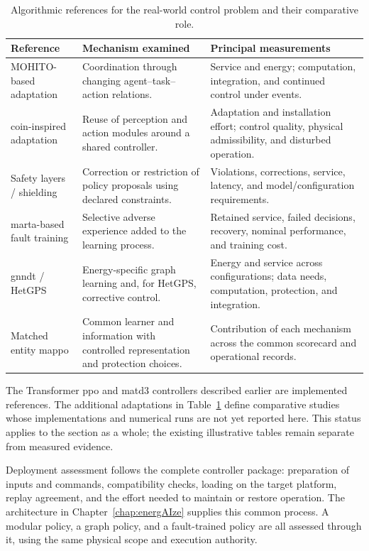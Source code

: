 \begin{table}[htbp]
\centering
\small
\caption{Algorithmic references for the real-world control problem and their comparative role.}
\label{tab:control-variable-references}
\begin{tabularx}{\textwidth}{@{}p{}p{}X@{}}
\toprule
\textbf{Reference} & \textbf{Mechanism examined} & \textbf{Principal measurements}\\
\midrule
MOHITO-based adaptation & Coordination through changing agent--task--action relations. & Service and energy; computation, integration, and continued control under events.\\
\addlinespace
\gls{coin}-inspired adaptation & Reuse of perception and action modules around a shared controller. & Adaptation and installation effort; control quality, physical admissibility, and disturbed operation.\\
\addlinespace
Safety layers / shielding & Correction or restriction of policy proposals using declared constraints. & Violations, corrections, service, latency, and model/configuration requirements.\\
\addlinespace
\gls{marta}-based fault training & Selective adverse experience added to the learning process. & Retained service, failed decisions, recovery, nominal performance, and training cost.\\
\addlinespace
\gls{gnndt} / HetGPS & Energy-specific graph learning and, for HetGPS, corrective control. & Energy and service across configurations; data needs, computation, protection, and integration.\\
\addlinespace
Matched entity \gls{mappo} & Common learner and information with controlled representation and protection choices. & Contribution of each mechanism across the common scorecard and operational records.\\
\bottomrule
\end{tabularx}
\end{table}

The Transformer \gls{ppo} and \gls{matd3} controllers described earlier are implemented references. The additional adaptations in Table~\ref{tab:control-variable-references} define comparative studies whose implementations and numerical runs are not yet reported here. This status applies to the section as a whole; the existing illustrative tables remain separate from measured evidence.

Deployment assessment follows the complete controller package: preparation of inputs and commands, compatibility checks, loading on the target platform, replay agreement, and the effort needed to maintain or restore operation. The architecture in Chapter~\ref{chap:energAIze} supplies this common process. A modular policy, a graph policy, and a fault-trained policy are all assessed through it, using the same physical scope and execution authority.

